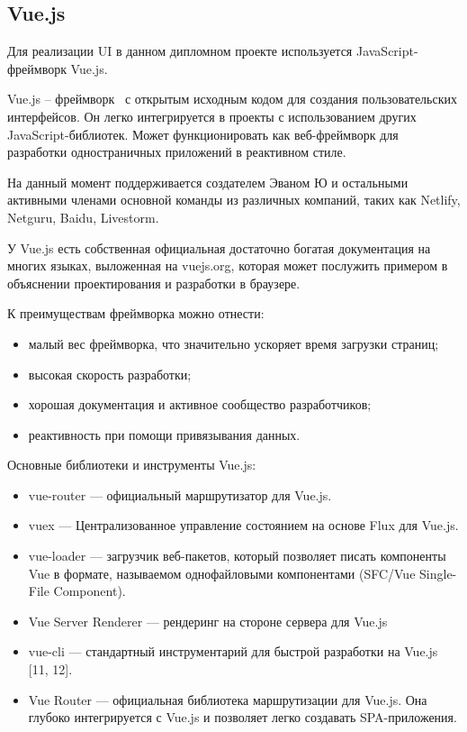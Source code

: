 \subsection{Vue.js}

Для реализации UI в данном дипломном проекте используется JavaScript-фреймворк Vue.js.

Vue.js – фреймворк~\cite{wiki_vue} с открытым исходным кодом для создания пользовательских интерфейсов. Он легко интегрируется в проекты с использованием других JavaScript-библиотек. Может функционировать как веб-фреймворк для разработки одностраничных приложений в реактивном стиле.

На данный момент поддерживается создателем Эваном Ю и остальными активными членами основной команды из различных компаний, таких как Netlify, Netguru, Baidu, Livestorm.

У Vue.js есть собственная официальная достаточно богатая документация на многих языках, выложенная на vuejs.org, которая может послужить примером в объяснении проектирования и разработки в браузере. 

К преимуществам фреймворка можно отнести:
\begin{itemize}
    \item малый вес фреймворка, что значительно ускоряет время загрузки страниц;
    \item высокая скорость разработки;
    \item хорошая документация и активное сообщество разработчиков;
    \item реактивность при помощи привязывания данных.
\end{itemize}

Основные библиотеки и инструменты Vue.js:
\begin{itemize}
    \item vue-router — официальный маршрутизатор для Vue.js.
    \item vuex — Централизованное управление состоянием на основе Flux для Vue.js.
    \item vue-loader — загрузчик веб-пакетов, который позволяет писать компоненты Vue в формате, называемом однофайловыми компонентами (SFC/Vue Single-File Component).
    \item Vue Server Renderer — рендеринг на стороне сервера для Vue.js
    \item vue-cli — стандартный инструментарий для быстрой разработки на Vue.js [11, 12].
    \item Vue Router — официальная библиотека маршрутизации для Vue.js. Она глубоко интегрируется с Vue.js и позволяет легко создавать SPA-приложе\-ния.
\end{itemize}

